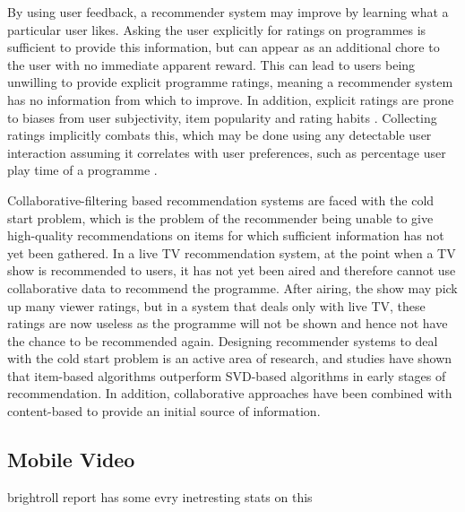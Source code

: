 	By using user feedback, a recommender system may improve by learning what a particular user likes. Asking the user explicitly for ratings on programmes is sufficient to provide this information, but can appear as an additional chore to the user with no immediate apparent reward. This can lead to users being unwilling to provide explicit programme ratings, meaning a recommender system has no information from which to improve. In addition, explicit ratings are prone to biases from user subjectivity, item popularity and rating habits \citep[p.~304]{recommender-systems-handbook}. Collecting ratings implicitly combats this, which may be done using any detectable user interaction assuming it correlates with user preferences, such as percentage user play time of a programme \citep[p.~305]{recommender-systems-handbook}.

	Collaborative-filtering based recommendation systems are faced with the cold start problem, which is the problem of the recommender being unable to give high-quality recommendations on items for which sufficient information has not yet been gathered. In a live TV recommendation system, at the point when a TV show is recommended to users, it has not yet been aired and therefore cannot use collaborative data to recommend the programme. After airing, the show may pick up many viewer ratings, but in a system that deals only with live TV, these ratings are now useless as the programme will not be shown and hence not have the chance to be recommended again. Designing recommender systems to deal with the cold start problem is an active area of research, and studies have shown that item-based algorithms outperform SVD-based algorithms in early stages of recommendation\cite{cold-start-problem}. In addition, collaborative approaches have been combined with content-based to provide an initial source of information\cite{generative_models}.

	\subsection{Mobile Video}

	brightroll report has some evry inetresting stats on this

